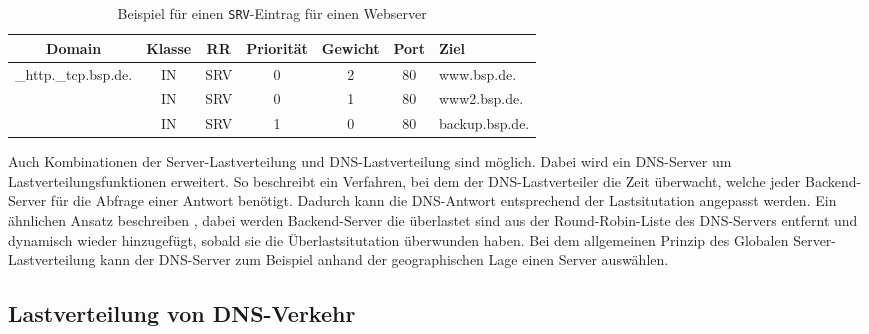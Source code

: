 \documentclass[a4paper, 12pt, BCOR10mm, DIV12, toc=bibliography, toc=listof, german]{scrbook}
\begin{document}
			\begin{table}
				\centering
				\begin{tabular}{|ccccccl|}\hline
				 Domain & Klasse & RR & Priorität & Gewicht & Port & Ziel \\\hline\hline
					\_http.\_tcp.bsp.de. & IN & SRV & 0 & 2 & 80 & www.bsp.de. \\	
					& IN & SRV & 0 & 1 & 80 & www2.bsp.de. \\	
					& IN & SRV & 1 & 0 & 80 & backup.bsp.de. \\\hline
				\end{tabular}
				\caption{Beispiel für einen \texttt{SRV}-Eintrag für einen Webserver}
				\label{tab:srv}
			\end{table}

			Auch Kombinationen der Server-Lastverteilung und DNS-Lastverteilung sind möglich. Dabei wird ein
			DNS-Server um Lastverteilungsfunktionen erweitert. So beschreibt \cite{chyuyi2003} ein
			Verfahren, bei dem der DNS-Lastverteiler die Zeit überwacht, welche jeder Backend-Server für
			die Abfrage einer Antwort benötigt. Dadurch kann die DNS-Antwort entsprechend der
			Lastsitutation angepasst werden. Ein ähnlichen Ansatz beschreiben \cite{mookim2005}, dabei
			werden Backend-Server die überlastet sind aus der Round-Robin-Liste des DNS-Servers entfernt
			und dynamisch wieder hinzugefügt, sobald sie die Überlastsitutation überwunden haben. Bei dem
			allgemeinen Prinzip des Globalen Server-Lastverteilung \cite{bourke2001} kann der DNS-Server
			zum Beispiel anhand der geographischen Lage einen Server auswählen.

			
			\subsection*{Lastverteilung von DNS-Verkehr} %

\end{document}
